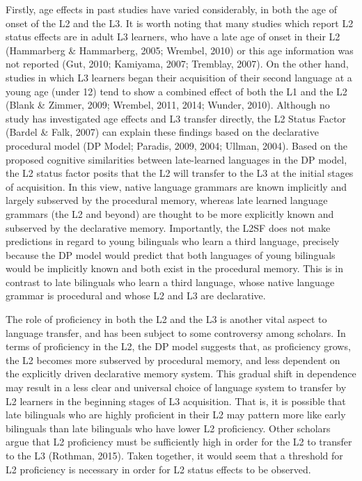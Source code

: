 \documentclass[
  english,
  man]{apa6}
\begin{document}
Firstly, age effects in past studies have varied considerably, in both the age of onset of the L2 and the L3.
It is worth noting that many studies which report L2 status effects are in adult L3 learners, who have a late age of onset in their L2 (Hammarberg \& Hammarberg, 2005; Wrembel, 2010) or this age information was not reported (Gut, 2010; Kamiyama, 2007; Tremblay, 2007).
On the other hand, studies in which L3 learners began their acquisition of their second language at a young age (under 12) tend to show a combined effect of both the L1 and the L2 (Blank \& Zimmer, 2009; Wrembel, 2011, 2014; Wunder, 2010).
Although no study has investigated age effects and L3 transfer directly, the L2 Status Factor (Bardel \& Falk, 2007) can explain these findings based on the declarative procedural model (DP Model; Paradis, 2009, 2004; Ullman, 2004).
Based on the proposed cognitive similarities between late-learned languages in the DP model, the L2 status factor posits that the L2 will transfer to the L3 at the initial stages of acquisition.
In this view, native language grammars are known implicitly and largely subserved by the procedural memory, whereas late learned language grammars (the L2 and beyond) are thought to be more explicitly known and subserved by the declarative memory.
Importantly, the L2SF does not make predictions in regard to young bilinguals who learn a third language, precisely because the DP model would predict that both languages of young bilinguals would be implicitly known and both exist in the procedural memory.
This is in contrast to late bilinguals who learn a third language, whose native language grammar is procedural and whose L2 and L3 are declarative.

The role of proficiency in both the L2 and the L3 is another vital aspect to language transfer, and has been subject to some controversy among scholars.
In terms of proficiency in the L2, the DP model suggests that, as proficiency grows, the L2 becomes more subserved by procedural memory, and less dependent on the explicitly driven declarative memory system.
This gradual shift in dependence may result in a less clear and universal choice of language system to transfer by L2 learners in the beginning stages of L3 acquisition.
That is, it is possible that late bilinguals who are highly proficient in their L2 may pattern more like early bilinguals than late bilinguals who have lower L2 proficiency.
Other scholars argue that L2 proficiency must be sufficiently high in order for the L2 to transfer to the L3 (Rothman, 2015).
Taken together, it would seem that a threshold for L2 proficiency is necessary in order for L2 status effects to be observed.
\end{document}
